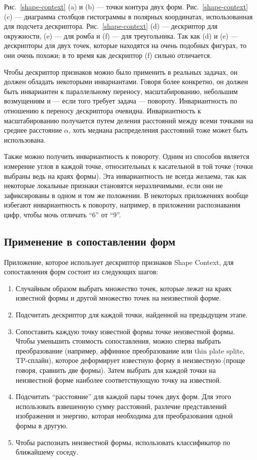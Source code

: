 Рис.~\ref{shape-context} (a) и (b) --- точки контура двух форм. Рис.~\ref{shape-context} (c) --- диаграмма столбцов гистограммы в полярных координатах, использованная для подсчета дескриптора. Рис.~\ref{shape-context} (d) --- дескриптор для окружности, (e) --- для ромба и (f) --- для треугольника. Так как (d) и (e) --- дескрипторы для двух точек, которые находятся на очень подобных фигурах, то они очень похожи; в то время как дескриптор (f) сильно отличается.

Чтобы дескриптор признаков можно было применить в реальных задачах, он должен обладать некоторыми инвариантами. Говоря более конкретно, он должен быть инвариантен к параллельному переносу, масштабированию, небольшим возмущениям и --- если того требует задача --- повороту. Инвариантность по отношению к переносу дескриптора очевидна. Инвариантность к масштабированию получается путем деления расстояний между всеми точками на среднее расстояние $\alpha$, хоть медиана распределения расстояний тоже может быть использована.

Также можно получить инвариантность к повороту. Одним из способов является измерение углов в каждой точке, относительных к касательной в той точке (точки выбраны ведь на краях формы). Эта инвариантность не всегда желаема, так как некоторые локальные признаки становятся неразличимыми, если они не зафиксированы в одном и том же положении. В некоторых приложениях вообще избегают инвариантность к повороту, например, в приложении распознавания цифр, чтобы мочь отличать ``6'' от ``9''.

\subsection{Применение в сопоставлении форм}
Приложение, которое использует дескриптор признаков Shape Context, для сопоставления форм состоит из следующих шагов:
\begin{enumerate}
  \item Случайным образом выбрать множество точек, которые лежат на краях известной формы и другой множество точек на неизвестной форме.
  \item Подсчитать дескриптор для каждой точки, найденной на предыдущем этапе.
  \item Сопоставить каждую точку известной формы точке неизвестной формы. Чтобы уменьшить стоимость сопоставления, можно сперва выбрать преобразование (например, аффинное преобразование или thin plate splite, TP-сплайн), которое деформирует известную форму в неизвестную (проще говоря, сравнить две формы). Затем выбрать для каждой точки на неизвестной форме наиболее соответствующую точку на известной.
  \item Подсчитать ``расстояние'' для каждой пары точек двух форм. Для этого использовать взвешенную сумму расстояний, разлечие представлений изображения и энергию, которая необходима для преобразования одной формы в другую.
  \item Чтобы распознать неизвестной формы, использовать классификатор по ближайшему соседу.
\end{enumerate}


